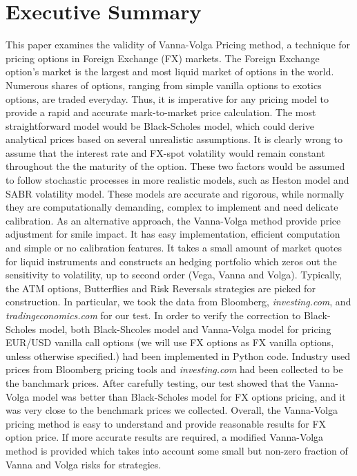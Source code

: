 \chapter{Executive Summary}
This paper examines the validity of Vanna-Volga Pricing method, a technique for pricing options in Foreign Exchange (FX) markets. 
\newline
\newline
The Foreign Exchange option's market is the largest and most liquid market of options in the world. Numerous shares of options, ranging from simple vanilla options to exotics options, are traded everyday. Thus, it is imperative for any pricing model to provide a rapid and accurate mark-to-market price calculation.
\newline
\newline
The most straightforward model would be Black-Scholes model, which could derive analytical prices based on several unrealistic assumptions. It is clearly wrong to assume that the interest rate and FX-spot volatility would remain constant throughout the the maturity of the option. These two factors would be assumed to follow stochastic processes in more realistic models, such as Heston model and SABR volatility model. These models are accurate and rigorous, while normally they are computationally demanding, complex to implement and need delicate calibration. 
\newline
\newline
As an alternative approach, the Vanna-Volga method provide price adjustment for smile impact. It has easy implementation, efficient computation and simple or no calibration features. It takes a small amount of market quotes for liquid instruments and constructs an hedging portfolio which zeros out the sensitivity to volatility, up to second order (Vega, Vanna and Volga). Typically, the ATM options, Butterflies and Risk Reversals strategies are picked for construction. 
\newline
\newline
In particular, we took the data from Bloomberg, \textit{investing.com}, and \textit{tradingeconomics.com} for our test. In order to verify the correction to Black-Scholes model, both Black-Shcoles model and Vanna-Volga model for pricing EUR/USD vanilla call options (we will use FX options as FX vanilla options, unless otherwise specified.) had been implemented in Python code. Industry used prices from Bloomberg pricing tools and \textit{investing.com} had been collected to be the banchmark prices. After carefully testing, our test showed that the Vanna-Volga model was better than Black-Scholes model for FX options pricing, and it was very close to the benchmark prices we collected.
\newline
\newline
Overall, the Vanna-Volga pricing method is easy to understand and provide reasonable results for FX option price. If more accurate results are required, a modified Vanna-Volga method is provided which takes into account some small but non-zero fraction of Vanna and Volga risks for strategies.